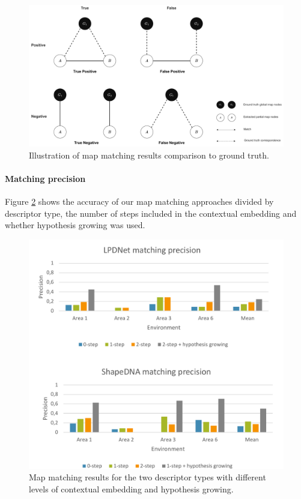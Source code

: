 \begin{figure}[h]
    \centering
    \includegraphics*[width=\textwidth]{./fig/map_match_eval.drawio.pdf}
    \caption{Illustration of map matching results comparison to ground truth.}
    \label{fig:mapmatch_eval}
\end{figure}

\paragraph{Matching precision}
Figure \ref{fig:lpdnet_match} shows the accuracy of our map matching approaches divided by descriptor type, the number of steps included in the contextual embedding and whether hypothesis growing was used. 

\begin{figure}[h]
    \centering
    \includegraphics*[width=\textwidth]{./fig/match_charts.pdf}
    \caption{Map matching results for the two descriptor types with different levels of contextual embedding and hypothesis growing.}
    \label{fig:lpdnet_match}
\end{figure}


